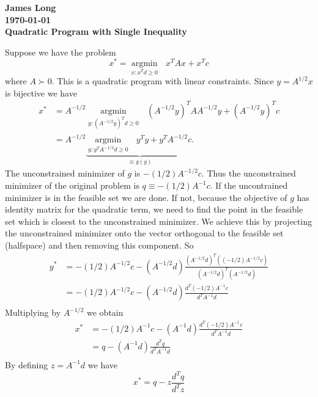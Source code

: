 \documentclass[12pt]{article}
\title{}
\date{}
\author{}
\newcommand{\argmin}[1]{\underset{#1}{\operatorname{argmin}}\text{ }}
\begin{document}
\noindent
\textbf{James Long}\\
\textbf{\today}\\
\textbf{Quadratic Program with Single Inequality}

Suppose we have the problem
\begin{equation*}
x^* = \argmin{x:x^Td \geq 0} x^TAx + x^Tc
\end{equation*}
where $A \succ 0$. This is a quadratic program with linear constraints. Since $y = A^{1/2}x$ is bijective we have
\begin{align*}
x^* &= A^{-1/2}\argmin{y:(A^{-1/2}y)^Td \geq 0} (A^{-1/2}y)^TAA^{-1/2}y + (A^{-1/2}y)^Tc\\
&= A^{-1/2}\underbrace{\argmin{y:y^TA^{-1/2}d \geq 0} y^Ty + y^TA^{-1/2}c.}_{\equiv g(y)}
\end{align*}
The unconstrained minimizer of $g$ is $-(1/2)A^{-1/2}c$. Thus the unconstrained minimizer of the original problem is $q \equiv -(1/2)A^{-1}c$. If the uncontrained minimizer is in the feasible set we are done. If not, because the objective of $g$ has identity matrix for the quadratic term, we need to find the point in the feasible set which is closest to the unconstrained minimizer. We achieve this by projecting the unconstrained minimizer onto the vector orthogonal to the feasible set (halfspace) and then removing this component. So
\begin{align*}
y^* &= -(1/2)A^{-1/2}c - (A^{-1/2}d) \frac{(A^{-1/2}d)^T((-1/2)A^{-1/2}c)}{(A^{-1/2}d)^T(A^{-1/2}d)}\\
&= -(1/2)A^{-1/2}c - (A^{-1/2}d) \frac{d^T(-1/2)A^{-1}c}{d^TA^{-1}d}\\
\end{align*}
Multiplying by $A^{-1/2}$ we obtain
\begin{align*}
x^{*} &= -(1/2)A^{-1}c - (A^{-1}d)\frac{d^T(-1/2)A^{-1}c}{d^TA^{-1}d}\\
&= q - (A^{-1}d)\frac{d^Tq}{d^TA^{-1}d}\\
\end{align*}
By defining $z = A^{-1}d$ we have
\begin{equation*}
x^* = q - z\frac{d^Tq}{d^Tz}
\end{equation*}



%
%
\end{document}
